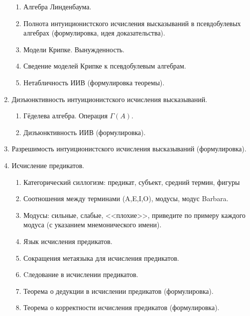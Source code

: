 \documentclass[11pt,a4paper,oneside]{scrartcl}
\begin{document}
\begin{enumerate}
\begin{enumerate}
\item Алгебра Линденбаума. 
\item Полнота интуиционистского исчисления высказываний в псевдобулевых алгебрах (формулировка, идея доказательства).
\item Модели Крипке. Вынужденность.
\item Сведение моделей Крипке к псевдобулевым алгебрам. 
\item Нетабличность ИИВ (формулировка теоремы).
\end{enumerate}
\item Дизъюнктивность интуиционистского исчисления высказываний.
\begin{enumerate}
\item Гёделева алгебра. Операция $\Gamma(A)$.
\item Дизъюнктивность ИИВ (формулировка).
\end{enumerate}
\item Разрешимость интуиционистского исчисления высказываний (формулировка).
\item Исчисление предикатов.
\begin{enumerate}
\item Категорический силлогизм: предикат, субъект, средний термин, фигуры
\item Соотношения между терминами (A,E,I,O), модусы, модус Barbara.
\item Модусы: сильные, слабые, <<плохие>>, приведите по примеру каждого модуса (с указанием мнемонического имени).
\item Язык исчисления предикатов.
\item Сокращения метаязыка для исчисления предикатов.
\item Cледование в исчислении предикатов.
\item Теорема о дедукции в исчислении предикатов (формулировка).
\item Теорема о корректности исчисления предикатов (формулировка).
\end{enumerate}

\end{enumerate}
\end{document}
